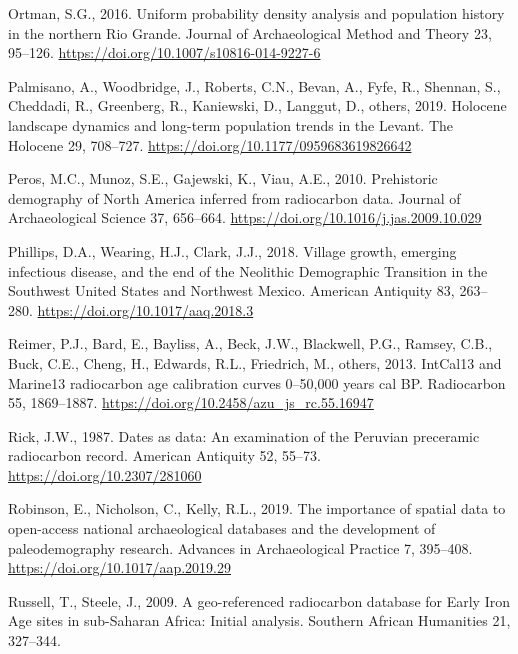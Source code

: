 \documentclass[
]{article}
\newlength{\cslhangindent}
\newenvironment{cslreferences}%
  {\setlength{\parindent}{0pt}%
  \everypar{\setlength{\hangindent}{\cslhangindent}}\ignorespaces}%
  {\par}
\begin{document}
\begin{cslreferences}
\leavevmode\hypertarget{ref-Ortman2016}{}%
Ortman, S.G., 2016. Uniform probability density analysis and population history in the northern Rio Grande. Journal of Archaeological Method and Theory 23, 95--126. \url{https://doi.org/10.1007/s10816-014-9227-6}

\leavevmode\hypertarget{ref-Palmisano2019}{}%
Palmisano, A., Woodbridge, J., Roberts, C.N., Bevan, A., Fyfe, R., Shennan, S., Cheddadi, R., Greenberg, R., Kaniewski, D., Langgut, D., others, 2019. Holocene landscape dynamics and long-term population trends in the Levant. The Holocene 29, 708--727. \url{https://doi.org/10.1177/0959683619826642}

\leavevmode\hypertarget{ref-Peros2010}{}%
Peros, M.C., Munoz, S.E., Gajewski, K., Viau, A.E., 2010. Prehistoric demography of North America inferred from radiocarbon data. Journal of Archaeological Science 37, 656--664. \url{https://doi.org/10.1016/j.jas.2009.10.029}

\leavevmode\hypertarget{ref-Phillips2018}{}%
Phillips, D.A., Wearing, H.J., Clark, J.J., 2018. Village growth, emerging infectious disease, and the end of the Neolithic Demographic Transition in the Southwest United States and Northwest Mexico. American Antiquity 83, 263--280. \url{https://doi.org/10.1017/aaq.2018.3}

\leavevmode\hypertarget{ref-Reimer2013}{}%
Reimer, P.J., Bard, E., Bayliss, A., Beck, J.W., Blackwell, P.G., Ramsey, C.B., Buck, C.E., Cheng, H., Edwards, R.L., Friedrich, M., others, 2013. IntCal13 and Marine13 radiocarbon age calibration curves 0--50,000 years cal BP. Radiocarbon 55, 1869--1887. \url{https://doi.org/10.2458/azu_js_rc.55.16947}

\leavevmode\hypertarget{ref-Rick1987}{}%
Rick, J.W., 1987. Dates as data: An examination of the Peruvian preceramic radiocarbon record. American Antiquity 52, 55--73. \url{https://doi.org/10.2307/281060}

\leavevmode\hypertarget{ref-Robinson2019}{}%
Robinson, E., Nicholson, C., Kelly, R.L., 2019. The importance of spatial data to open-access national archaeological databases and the development of paleodemography research. Advances in Archaeological Practice 7, 395--408. \url{https://doi.org/10.1017/aap.2019.29}

\leavevmode\hypertarget{ref-Russell2009}{}%
Russell, T., Steele, J., 2009. A geo-referenced radiocarbon database for Early Iron Age sites in sub-Saharan Africa: Initial analysis. Southern African Humanities 21, 327--344.


\end{cslreferences}
\end{document}
